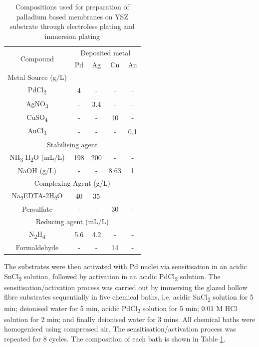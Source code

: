 \begin{table}[]
    \centering
    \caption{Compositions used for preparation of palladium based membranes on YSZ substrate through electroless plating and immersion plating}
    \label{ELP}
    \begin{tabular}{@{}ccccc@{}}
    \toprule
    \multirow{2}{*}{Compound} & \multicolumn{4}{c}{Deposited metal} \\
                              & Pd      & Ag     & Cu      & Au     \\ \midrule
    Metal Source (g/L)        &         &        &         &        \\ \midrule
    PdCl\textsubscript{2}                     & 4       & -      & -       & -      \\
    AgNO\textsubscript{3}                     & -       & 3.4    & -       & -      \\
    CuSO\textsubscript{4}                     & -       & -      & 10      & -      \\
    AuCl\textsubscript{3}                     & -       & -      & -       & 0.1    \\ \midrule
    \multicolumn{5}{c}{Stabilising agent}                           \\ \midrule
    NH\textsubscript{3}-H\textsubscript{2}O (mL/L)            & 198     & 200    & -       & -      \\
    NaOH (g/L)                & -       & -      & 8.63    & 1      \\ \midrule
    \multicolumn{5}{c}{Complexing Agent (g/L)}                      \\ \midrule
    Na\textsubscript{2}EDTA-2H\textsubscript{2}O              & 40      & 35     & -       & -      \\
    Persulfate                & -       & -      & 30      & -      \\ \midrule
    \multicolumn{5}{c}{Reducing agent (mL/L)}                       \\ \midrule
    N\textsubscript{2}H\textsubscript{4}                      & 5.6     & 4.2    & -       & -      \\
    Formaldehyde              & -       & -      & 14      & -      \\ \bottomrule
    \end{tabular}
    \end{table}

The substrates were then activated with Pd nuclei via sensitisation in an acidic SnCl\textsubscript{2} solution, followed by activation in an acidic PdCl\textsubscript{2} solution. The sensitisation/activation 
process was carried out by immersing the glazed hollow fibre substrates sequentially in five chemical baths, i.e. acidic SnCl\textsubscript{2} solution for 5 min; deionised water for 5 min, acidic PdCl\textsubscript{2} solution for 5 min; 0.01 M HCl solution for 2 min; and finally deionised water for 3 mins. 
All chemical baths were homogenised using compressed air. The sensitisation/activation process was repeated for 8 cycles. The composition of each bath is shown in Table \ref{ELP}.


